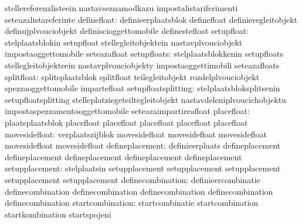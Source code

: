                                  stellereferenzlisteein           nastavseznamodkazu
                                  impostalistariferimenti          seteazalistareferinte
                     definefloat: definieerplaatsblok              definefloat
                                  definieregleitobjekt             definujplvouciobjekt
                                  definiscioggettomobile           definestefloat
                      setupfloat: stelplaatsblokin                 setupfloat
                                  stellegleitobjektein             nastavplvouciobjekt
                                  impostaoggettomobile             seteazafloat
                     setupfloats: stelplaatsblokkenin              setupfloats
                                  stellegleitobjekteein            nastavplvouciobjekty
                                  impostaoggettimobili             seteazafloats
                      splitfloat: splitsplaatsblok                 splitfloat
                                  teilegleitobjekt                 rozdelplvouciobjekt
                                  spezzaoggettomobile              impartefloat
             setupfloatsplitting: stelplaatsbloksplitsenin         setupfloatsplitting
                                  stelleplatziegeteiltegleitobjekt nastavdeleniplvoucichobjektu
                                  impostaspezzamentooggettomobile  seteazaimpartireafloat
                      placefloat: plaatsplaatsblok                 placefloat
                                  placefloat                       placefloat
                                  placefloat                       placefloat %
  movesidefloat: verplaatszijblok                 movesidefloat
                 movesidefloat                    movesidefloat
                 movesidefloat                    movesidefloat
defineplacement: definieerplaats                  defineplacement
                 defineplacement                  defineplacement
                 defineplacement                  defineplacement
 setupplacement: stelplaatsin                     setupplacement
                 setupplacement                   setupplacement
                 setupplacement                   setupplacement
               definecombination: definieercombinatie              definecombination
                                  definecombination                definecombination
                                  definecombination                definecombination
                startcombination: startcombinatie                  startcombination
                                  startkombination                 startspojeni
